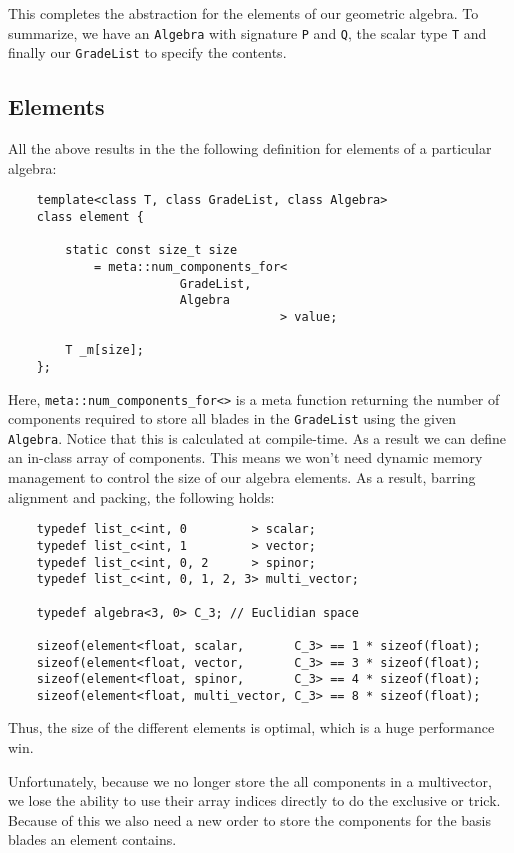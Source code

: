 \documentclass[10pt]{article}
\begin{document}
This completes the abstraction for the elements of our geometric algebra. To summarize, we have an \verb"Algebra" with signature \verb"P" and
\verb"Q", the scalar type \verb"T" and finally our \verb"GradeList" to specify the contents. 

\subsection{Elements}

All the above results in the the following definition for elements
of a particular algebra:
\begin{verbatim}
    template<class T, class GradeList, class Algebra>
    class element {

        static const size_t size
            = meta::num_components_for<
                        GradeList,
                        Algebra
                                      > value;

        T _m[size];
    };
\end{verbatim}

Here, \verb"meta::num_components_for<>" is a meta function
returning the number of components required to store all blades in
the \verb"GradeList" using the given \verb"Algebra". Notice that
this is calculated at compile-time. As a result we can define an
in-class array of components. This means we won't need dynamic
memory management to control the size of our algebra elements. As
a result, barring alignment and packing, the following holds:

\begin{verbatim}
    typedef list_c<int, 0         > scalar;
    typedef list_c<int, 1         > vector;
    typedef list_c<int, 0, 2      > spinor;
    typedef list_c<int, 0, 1, 2, 3> multi_vector;

    typedef algebra<3, 0> C_3; // Euclidian space

    sizeof(element<float, scalar,       C_3> == 1 * sizeof(float);
    sizeof(element<float, vector,       C_3> == 3 * sizeof(float);
    sizeof(element<float, spinor,       C_3> == 4 * sizeof(float);
    sizeof(element<float, multi_vector, C_3> == 8 * sizeof(float);
\end{verbatim}

Thus, the size of the different elements is optimal, which is a huge performance win.

Unfortunately, because we no longer store the all components in a multivector, we lose the ability to use their array indices directly to do the exclusive or trick. Because of this we also need a new order to store the components for the basis blades an element contains.
\end{document}
